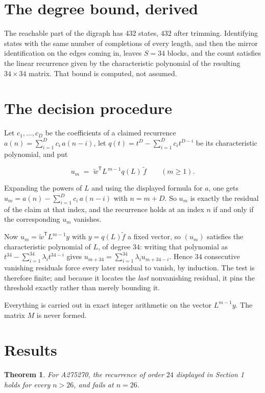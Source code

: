 \documentclass[11pt]{article}
\newtheorem{theorem}{Theorem}
\theoremstyle{definition}
\begin{document}
\section{The degree bound, derived}

The reachable part of the digraph has $432$ states, $432$ after trimming. Identifying states with the same number of completions of every length, and then the mirror identification on the edges coming in, leaves $S = 34$ blocks, and the count satisfies the linear recurrence given by the characteristic polynomial of the resulting $34\times34$ matrix. That bound is computed, not assumed.

\section{The decision procedure}

Let $c_1,\dots,c_D$ be the coefficients of a claimed recurrence $a(n) = \sum_{i=1}^{D} c_i\,a(n-i)$, let $q(t) = t^{D} - \sum_{i=1}^{D} c_i t^{D-i}$ be its characteristic polynomial, and put

\[u_m \;=\; \tilde w^{\mathsf T} L^{\,m-1} q(L)\,\tilde f \qquad (m \ge 1).\]

Expanding the powers of $L$ and using the displayed formula for $a$, one gets $u_m = a(n) - \sum_{i=1}^{D} c_i\,a(n-i)$ with $n = m + D$. So $u_m$ is exactly the residual of the claim at that index, and the recurrence holds at an index $n$ if and only if the corresponding $u_m$ vanishes.

Now $u_m = \tilde w^{\mathsf T} L^{m-1} y$ with $y = q(L)\tilde f$ a fixed vector, so $(u_m)$ satisfies the characteristic polynomial of $L$, of degree $34$: writing that polynomial as $t^{34} - \sum_{i=1}^{34} \lambda_i t^{34-i}$ gives $u_{m+34} = \sum_{i=1}^{34} \lambda_i u_{m+34-i}$. Hence $34$ consecutive vanishing residuals force every later residual to vanish, by induction. The test is therefore finite; and because it locates the {\itshape last} nonvanishing residual, it pins the threshold exactly rather than merely bounding it.

Everything is carried out in exact integer arithmetic on the vector $L^{m-1}y$. The matrix $M$ is never formed.

\section{Results}

\begin{theorem} For A275270, the recurrence of order $24$ displayed in Section 1 holds for every $n > 26$, and fails at $n = 26$.\end{theorem}
\end{document}
